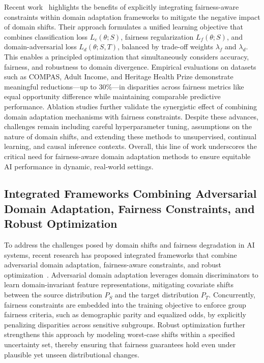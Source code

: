 \documentclass[sigconf]{acmart}
\begin{document}
Recent work~\cite{ref26} highlights the benefits of explicitly integrating fairness-aware constraints within domain adaptation frameworks to mitigate the negative impact of domain shifts. Their approach formulates a unified learning objective that combines classification loss \(L_c(\theta; S)\), fairness regularization \(L_f(\theta; S)\), and domain-adversarial loss \(L_d(\theta; S, T)\), balanced by trade-off weights \(\lambda_f\) and \(\lambda_d\). This enables a principled optimization that simultaneously considers accuracy, fairness, and robustness to domain divergence. Empirical evaluations on datasets such as COMPAS, Adult Income, and Heritage Health Prize demonstrate meaningful reductions—up to 30\%—in disparities across fairness metrics like equal opportunity difference while maintaining comparable predictive performance. Ablation studies further validate the synergistic effect of combining domain adaptation mechanisms with fairness constraints. Despite these advances, challenges remain including careful hyperparameter tuning, assumptions on the nature of domain shifts, and extending these methods to unsupervised, continual learning, and causal inference contexts. Overall, this line of work underscores the critical need for fairness-aware domain adaptation methods to ensure equitable AI performance in dynamic, real-world settings.

\subsection{Integrated Frameworks Combining Adversarial Domain Adaptation, Fairness Constraints, and Robust Optimization}

To address the challenges posed by domain shifts and fairness degradation in AI systems, recent research has proposed integrated frameworks that combine adversarial domain adaptation, fairness-aware constraints, and robust optimization~\cite{ref26}. Adversarial domain adaptation leverages domain discriminators to learn domain-invariant feature representations, mitigating covariate shifts between the source distribution \(P_S\) and the target distribution \(P_T\). Concurrently, fairness constraints are embedded into the training objective to enforce group fairness criteria, such as demographic parity and equalized odds, by explicitly penalizing disparities across sensitive subgroups. Robust optimization further strengthens this approach by modeling worst-case shifts within a specified uncertainty set, thereby ensuring that fairness guarantees hold even under plausible yet unseen distributional changes.
\end{document}
